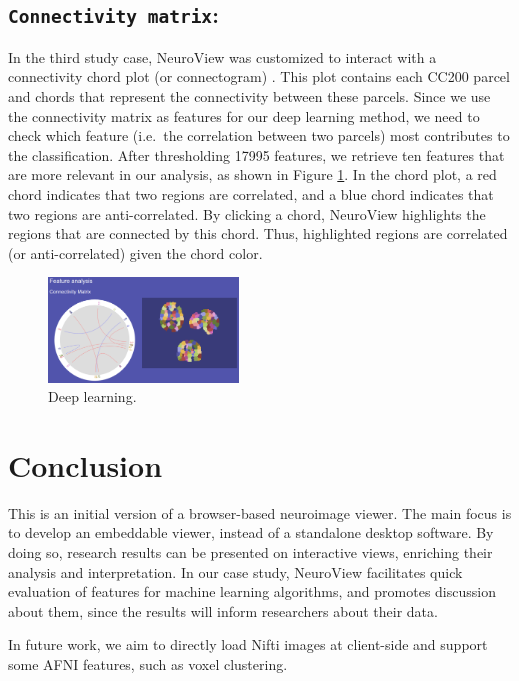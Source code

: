 \documentclass[twocolumn]{bmcart}%
\begin{document}
\subsection{\texorpdfstring{\texttt{Connectivity matrix}:}{:}}\label{section-2}

In the third study case, NeuroView was customized to interact with a
connectivity chord plot (or connectogram) \cite{Irimia2012}. This plot
contains each CC200 parcel and chords that represent the connectivity
between these parcels. Since we use the connectivity matrix as features
for our deep learning method, we need to check which feature (i.e.~the
correlation between two parcels) most contributes to the classification.
After thresholding 17995 features, we retrieve ten features that are
more relevant in our analysis, as shown in Figure
\ref{fig:deeplearning}. In the chord plot, a red chord indicates that
two regions are correlated, and a blue chord indicates that two regions
are anti-correlated. By clicking a chord, NeuroView highlights the
regions that are connected by this chord. Thus, highlighted regions are
correlated (or anti-correlated) given the chord color.

\begin{figure}[ht]
\centering
\includegraphics[width=0.45\textwidth]{figs/deeplearning.png}
\caption{Deep learning.}
\label{fig:deeplearning}
\end{figure}

\section{Conclusion}\label{conclusion}

This is an initial version of a browser-based neuroimage viewer. The
main focus is to develop an embeddable viewer, instead of a standalone
desktop software. By doing so, research results can be presented on
interactive views, enriching their analysis and interpretation. In our
case study, NeuroView facilitates quick evaluation of features for
machine learning algorithms, and promotes discussion about them, since
the results will inform researchers about their data.

In future work, we aim to directly load Nifti images at client-side and
support some AFNI features, such as voxel clustering.
\end{document}

